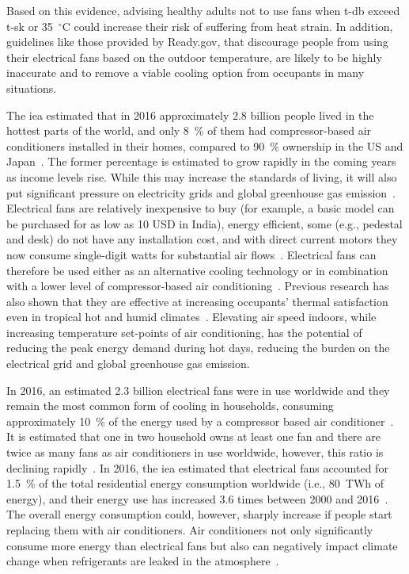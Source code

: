 Based on this evidence, advising healthy adults not to use fans when \ac{t-db} exceed \ac{t-sk} or 35~$^{\circ}$C could increase their risk of suffering from heat strain.
In addition, guidelines like those provided by Ready.gov, that discourage people from using their electrical fans based on the outdoor temperature, are likely to be highly inaccurate and to remove a viable cooling option from occupants in many situations.

The \ac{iea} estimated that in 2016 approximately 2.8 billion people lived in the hottest parts of the world, and only 8~\% of them had compressor-based air conditioners installed in their homes, compared to 90~\% ownership in the US and Japan~\cite{IEA2018}.
The former percentage is estimated to grow rapidly in the coming years as income levels rise.
While this may increase the standards of living, it will also put significant pressure on electricity grids and global greenhouse gas emission~\cite{IEA2018}.
Electrical fans are relatively inexpensive to buy (for example, a basic model can be purchased for as low as 10 USD in India), energy efficient, some (e.g., pedestal and desk) do not have any installation cost, and with direct current motors they now consume single-digit watts for substantial air flows~\cite{Yang2015a}.
Electrical fans can therefore be used either as an alternative cooling technology or in combination with a lower level of compressor-based air conditioning~\cite{Jay2019a, Hoyt2015, Schiavon2008}.
Previous research has also shown that they are effective at increasing occupants' thermal satisfaction even in tropical hot and humid climates~\cite{Lipczynska2018a}.
Elevating air speed indoors, while increasing temperature set-points of air conditioning, has the potential of reducing the peak energy demand during hot days, reducing the burden on the electrical grid and global greenhouse gas emission.

In 2016, an estimated 2.3 billion electrical fans were in use worldwide and they remain the most common form of cooling in households, consuming approximately 10~\% of the energy used by a compressor based air conditioner~\cite{IEA2018}.
It is estimated that one in two household owns at least one fan and there are twice as many fans as air conditioners in use worldwide, however, this ratio is declining rapidly~\cite{IEA2018}.
In 2016, the \ac{iea} estimated that electrical fans accounted for 1.5~\% of the total residential energy consumption worldwide (i.e., 80~TWh of energy), and their energy use has increased 3.6 times between 2000 and 2016~\cite{IEA2018}.
The overall energy consumption could, however, sharply increase if people start replacing them with air conditioners.
Air conditioners not only significantly consume more energy than electrical fans but also can negatively impact climate change when refrigerants are leaked in the atmosphere~\cite{IEA2018}.

